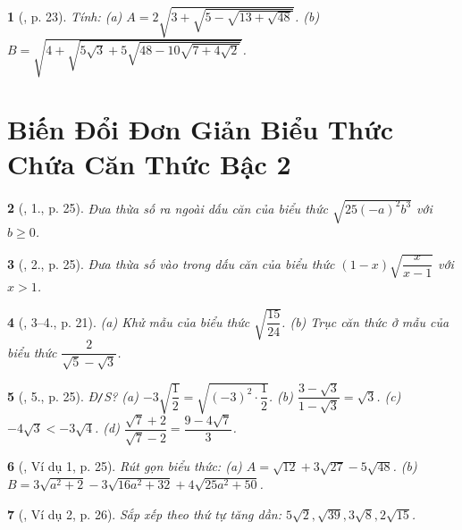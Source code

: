 \documentclass{article}
\newtheorem{baitoan}{}%
\begin{document}
\begin{baitoan}[\cite{Binh_boi_duong_Toan_9_tap_1}, p. 23]
	Tính: (a) $A = 2\sqrt{3 + \sqrt{5 - \sqrt{13 + \sqrt{48}}}}$. (b) $B = \sqrt{4 + \sqrt{5\sqrt{3} + 5\sqrt{48 - 10\sqrt{7 + 4\sqrt{2}}}}}$.
\end{baitoan}


\section{Biến Đổi Đơn Giản Biểu Thức Chứa Căn Thức Bậc 2}

\begin{baitoan}[\cite{Binh_boi_duong_Toan_9_tap_1}, 1., p. 25]
	Đưa thừa số ra ngoài dấu căn của biểu thức $\sqrt{25(-a)^2b^3}$ với $b\ge0$.
\end{baitoan}

\begin{baitoan}[\cite{Binh_boi_duong_Toan_9_tap_1}, 2., p. 25]
	Đưa thừa số vào trong dấu căn của biểu thức $(1 - x)\sqrt{\dfrac{x}{x - 1}}$ với $x > 1$.
\end{baitoan}

\begin{baitoan}[\cite{Binh_boi_duong_Toan_9_tap_1}, 3--4., p. 21]
	(a) Khử mẫu của biểu thức $\sqrt{\dfrac{15}{24}}$. (b) Trục căn thức ở mẫu của biểu thức $\dfrac{2}{\sqrt{5} - \sqrt{3}}$.
\end{baitoan}

\begin{baitoan}[\cite{Binh_boi_duong_Toan_9_tap_1}, 5., p. 25]
	{\rm Đ{\tt/}S?} (a) $-3\sqrt{\dfrac{1}{2}} = \sqrt{(-3)^2\cdot\dfrac{1}{2}}$. (b) $\dfrac{3 - \sqrt{3}}{1 - \sqrt{3}} = \sqrt{3}$. (c) $-4\sqrt{3} < -3\sqrt{4}$. (d) $\dfrac{\sqrt{7} + 2}{\sqrt{7} - 2} = \dfrac{9 - 4\sqrt{7}}{3}$.
\end{baitoan}

\begin{baitoan}[\cite{Binh_boi_duong_Toan_9_tap_1}, Ví dụ 1, p. 25]
	Rút gọn biểu thức: (a) $A = \sqrt{12} + 3\sqrt{27} - 5\sqrt{48}$. (b) $B = 3\sqrt{a^2 + 2} - 3\sqrt{16a^2 + 32} + 4\sqrt{25a^2 + 50}$.
\end{baitoan}

\begin{baitoan}[\cite{Binh_boi_duong_Toan_9_tap_1}, Ví dụ 2, p. 26]
	Sắp xếp theo thứ tự tăng dần: $5\sqrt{2},\sqrt{39},3\sqrt{8},2\sqrt{15}$.
\end{baitoan}
\end{document}
